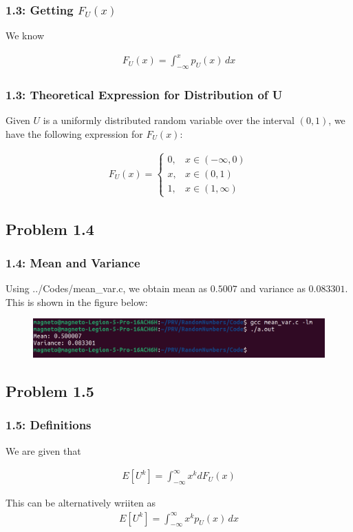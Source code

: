 \documentclass{beamer}
\begin{document}
\begin{frame}
	\frametitle{1.3: Getting $F_U(x)$}

	We know

	\begin{align}
		F_U(x) = \int_{-\infty}^{x} p_U(x) \,dx
		\label{eq:Relation}
	\end{align}

\end{frame}

\begin{frame}
	\frametitle{1.3: Theoretical Expression for Distribution of U}
	Given $U$ is a uniformly distributed random variable over the interval $(0, 1)$, we have the following expression for $F_U(x)$:
	
	\begin{align}
		F_U(x) = 
		\begin{cases}
			0, & x \in (-\infty, 0) \\
      			x, & x \in (0, 1) \\
      			1, & x \in (1, \infty)
    		\end{cases}
	\end{align}
\end{frame}

\subsection{Problem 1.4}
\begin{frame}
	\frametitle{1.4: Mean and Variance}
	Using ../Codes/mean\_var.c, we obtain mean as $0.5007$ and variance as $0.083301$. This is shown in the figure below:
	\begin{figure}
		\centerline{\includegraphics[width=\textheight]{../figs/screen1.png}}
		\label{fig2}
	\end{figure}	
\end{frame}

\subsection{Problem 1.5}
\begin{frame}
	\frametitle{1.5: Definitions}

	We are given that

	\begin{align}
		E[U^k] = \int^{\infty}_{-\infty} x^k dF_U(x)
	\end{align}

	This can be alternatively wriiten as
	\begin{align}
		E[U^k] = \int^{\infty}_{-\infty} x^k p_U(x) \,dx
		\label{eq: Expected}
	\end{align}

\end{frame}
\end{document}
